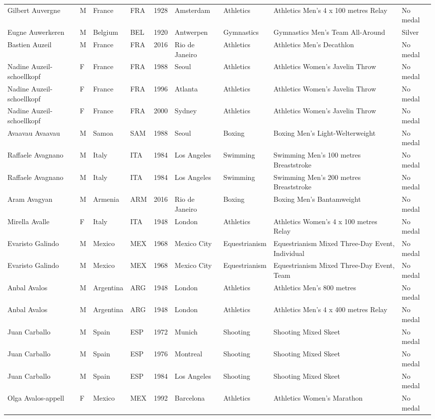 \documentclass{article}%
\begin{document}
\begin{longtable}{l l l l l l l l l}
Gilbert Auvergne&M&France&FRA&1928&Amsterdam&Athletics&Athletics Men's 4 x 100 metres Relay&No medal\\%
Eugne Auwerkeren&M&Belgium&BEL&1920&Antwerpen&Gymnastics&Gymnastics Men's Team All{-}Around&Silver\\%
Bastien Auzeil&M&France&FRA&2016&Rio de Janeiro&Athletics&Athletics Men's Decathlon&No medal\\%
Nadine Auzeil{-}schoellkopf&F&France&FRA&1988&Seoul&Athletics&Athletics Women's Javelin Throw&No medal\\%
Nadine Auzeil{-}schoellkopf&F&France&FRA&1996&Atlanta&Athletics&Athletics Women's Javelin Throw&No medal\\%
Nadine Auzeil{-}schoellkopf&F&France&FRA&2000&Sydney&Athletics&Athletics Women's Javelin Throw&No medal\\%
Avaavau Avaavau&M&Samoa&SAM&1988&Seoul&Boxing&Boxing Men's Light{-}Welterweight&No medal\\%
Raffaele Avagnano&M&Italy&ITA&1984&Los Angeles&Swimming&Swimming Men's 100 metres Breaststroke&No medal\\%
Raffaele Avagnano&M&Italy&ITA&1984&Los Angeles&Swimming&Swimming Men's 200 metres Breaststroke&No medal\\%
Aram Avagyan&M&Armenia&ARM&2016&Rio de Janeiro&Boxing&Boxing Men's Bantamweight&No medal\\%
Mirella Avalle&F&Italy&ITA&1948&London&Athletics&Athletics Women's 4 x 100 metres Relay&No medal\\%
Evaristo Galindo&M&Mexico&MEX&1968&Mexico City&Equestrianism&Equestrianism Mixed Three{-}Day Event, Individual&No medal\\%
Evaristo Galindo&M&Mexico&MEX&1968&Mexico City&Equestrianism&Equestrianism Mixed Three{-}Day Event, Team&No medal\\%
Anbal Avalos&M&Argentina&ARG&1948&London&Athletics&Athletics Men's 800 metres&No medal\\%
Anbal Avalos&M&Argentina&ARG&1948&London&Athletics&Athletics Men's 4 x 400 metres Relay&No medal\\%
Juan Carballo&M&Spain&ESP&1972&Munich&Shooting&Shooting Mixed Skeet&No medal\\%
Juan Carballo&M&Spain&ESP&1976&Montreal&Shooting&Shooting Mixed Skeet&No medal\\%
Juan Carballo&M&Spain&ESP&1984&Los Angeles&Shooting&Shooting Mixed Skeet&No medal\\%
Olga Avalos{-}appell&F&Mexico&MEX&1992&Barcelona&Athletics&Athletics Women's Marathon&No medal\\%

\end{longtable}
\end{document}
